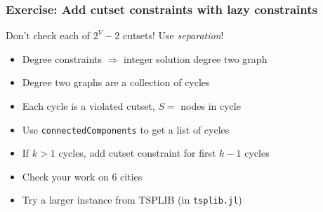 \documentclass{beamer}
\begin{document}
\begin{frame}
  \frametitle{Exercise: Add cutset constraints with lazy constraints}
  Don't check each of $2^V-2$ cutsets! Use \emph{separation}!\pause
  \begin{itemize}
  \item Degree constraints $\Rightarrow$ integer solution degree two graph\pause
  \item Degree two graphs are a collection of cycles\pause
  \item Each cycle is a violated cutset, $S =$ nodes in cycle\pause
  \item Use {\tt connectedComponents} to get a list of cycles\pause
  \item If $k > 1$ cycles, add cutset constraint for first $k-1$ cycles\pause
  \item Check your work on 6 cities
  \item Try a larger instance from TSPLIB (in {\tt tsplib.jl})
  \end{itemize}
\end{frame}
\end{document}

